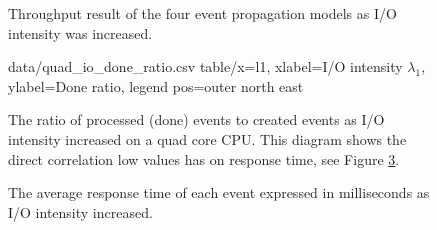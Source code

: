 \begin{figure}[h!]
    \centering
    \caption{Throughput result of the four event propagation models as I/O
    intensity was increased.}
    \label{fig:io_throughput}
\end{figure}

\begin{figure}[h!]
    \centering
    \performanceplot
    {data/quad_io_done_ratio.csv}
    {table/x=l1, xlabel=I/O intensity $\lambda_1$, ylabel=Done ratio, legend pos=outer north east}
    \caption{The ratio of processed (done) events to created events as I/O
    intensity increased on a quad core CPU. This diagram shows the direct
    correlation low values has on response time, see
    Figure \ref{fig:io_avg_d0}.}
    \label{fig:quad_io_done_ratio}
\end{figure}

\begin{figure}[h!]
    \centering
    \caption{The average response time of each event expressed in milliseconds
    as I/O intensity increased.}
    \label{fig:io_avg_d0}
\end{figure}

